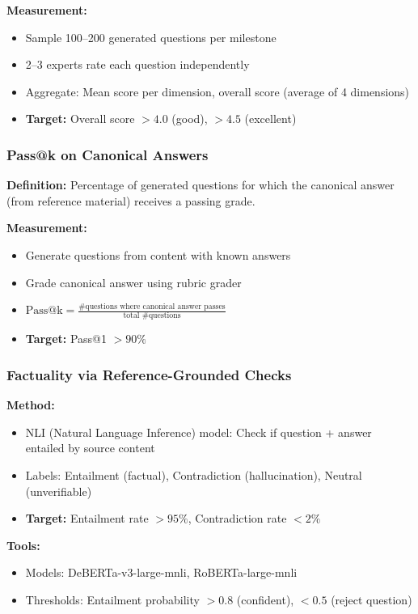 \documentclass[11pt,letterpaper]{article}
\begin{document}
\textbf{Measurement:}
\begin{itemize}
\item Sample 100--200 generated questions per milestone
\item 2--3 experts rate each question independently
\item Aggregate: Mean score per dimension, overall score (average of 4 dimensions)
\item \textbf{Target:} Overall score $> 4.0$ (good), $> 4.5$ (excellent)
\end{itemize}

\subsubsection{Pass@k on Canonical Answers}

\textbf{Definition:} Percentage of generated questions for which the canonical answer (from reference material) receives a passing grade.

\textbf{Measurement:}
\begin{itemize}
\item Generate questions from content with known answers
\item Grade canonical answer using rubric grader
\item $\text{Pass@k} = \frac{\text{\# questions where canonical answer passes}}{\text{total \# questions}}$
\item \textbf{Target:} Pass@1 $> 90\%$
\end{itemize}

\subsubsection{Factuality via Reference-Grounded Checks}

\textbf{Method:}
\begin{itemize}
\item NLI (Natural Language Inference) model: Check if question + answer entailed by source content
\item Labels: Entailment (factual), Contradiction (hallucination), Neutral (unverifiable)
\item \textbf{Target:} Entailment rate $> 95\%$, Contradiction rate $< 2\%$
\end{itemize}

\textbf{Tools:}
\begin{itemize}
\item Models: DeBERTa-v3-large-mnli, RoBERTa-large-mnli
\item Thresholds: Entailment probability $> 0.8$ (confident), $< 0.5$ (reject question)
\end{itemize}
\end{document}
